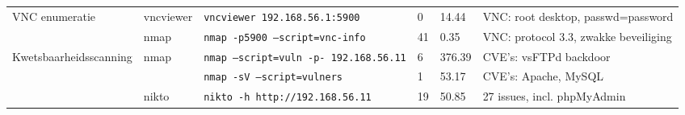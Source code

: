 {\begin{landscape}
\begin{longtable}{lllp{2cm}p{1.2cm}p{4cm}}
\multirow{2}{*}{VNC enumeratie} & vncviewer & \texttt{vncviewer 192.168.56.1:5900} & 0 & 14.44 & VNC: root desktop, passwd=password \\
 & nmap & \texttt{nmap -p5900 --script=vnc-info} & 41 & 0.35 & VNC: protocol 3.3, zwakke beveiliging \\
\multirow{3}{*}{Kwetsbaarheidsscanning} & \multirow{2}{*}{nmap} & \texttt{nmap --script=vuln -p- 192.168.56.11} & 6 & 376.39 & CVE's: vsFTPd backdoor \\
 & & \texttt{nmap -sV --script=vulners} & 1 & 53.17 & CVE's: Apache, MySQL \\
 & nikto & \texttt{nikto -h http://192.168.56.11} & 19 & 50.85 & 27 issues, incl. phpMyAdmin \\
\end{longtable}
\end{landscape}
}

